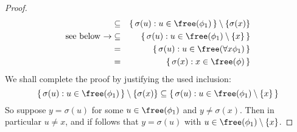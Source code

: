 \begin{proof}
\begin{eqnarray*}
    &\subseteq&\{\,\sigma(u):u\in\free(\phi_{1})\,\}\setminus\{\sigma(x)\}\\
    \mbox{see below\ $\rightarrow$}&\subseteq&\{\,\sigma(u):u\in\free(\phi_{1})\setminus\{x\}\,\}\\
    &=&\{\,\sigma(u):u\in\free(\forall x\phi_{1})\,\}\\
    &=&\{\,\sigma(x):x\in\free(\phi)\,\}
    \end{eqnarray*}
We shall complete the proof by justifying the used inclusion:
    \[
    \{\,\sigma(u):u\in\free(\phi_{1})\,\}\setminus\{\sigma(x)\}
    \subseteq\{\,\sigma(u):u\in\free(\phi_{1})\setminus\{x\}\,\}
    \]
So suppose $y=\sigma(u)$ for some $u\in\free(\phi_{1})$ and
$y\neq\sigma(x)$. Then in particular $u\neq x$, and if follows that
$y=\sigma(u)$ with $u\in\free(\phi_{1})\setminus\{x\}$.
\end{proof}

